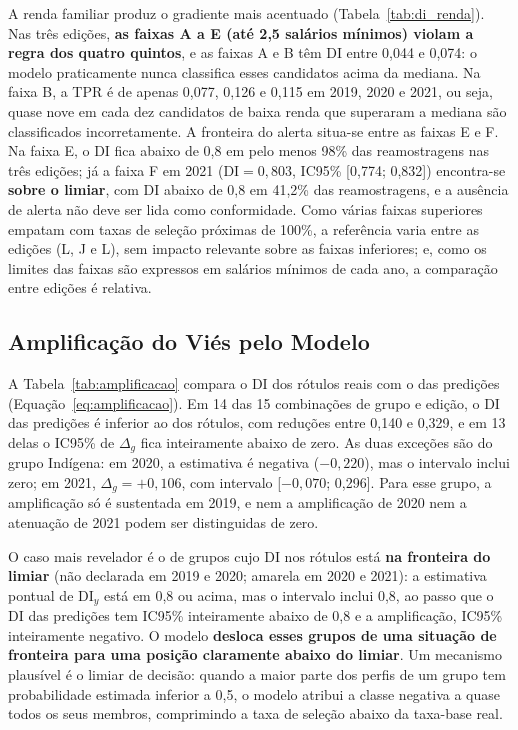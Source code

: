 A renda familiar produz o gradiente mais acentuado (Tabela~\ref{tab:di_renda}). Nas três edições, \textbf{as faixas A a E (até 2,5 salários mínimos) violam a regra dos quatro quintos}, e as faixas A e B têm DI entre 0,044 e 0,074: o modelo praticamente nunca classifica esses candidatos acima da mediana. Na faixa B, a TPR é de apenas 0,077, 0,126 e 0,115 em 2019, 2020 e 2021, ou seja, quase nove em cada dez candidatos de baixa renda que superaram a mediana são classificados incorretamente. A fronteira do alerta situa-se entre as faixas E e F. Na faixa E, o DI fica abaixo de 0,8 em pelo menos 98\% das reamostragens nas três edições; já a faixa F em 2021 ($\mathrm{DI} = 0{,}803$, IC95\% [0,774; 0,832]) encontra-se \textbf{sobre o limiar}, com DI abaixo de 0,8 em 41,2\% das reamostragens, e a ausência de alerta não deve ser lida como conformidade. Como várias faixas superiores empatam com taxas de seleção próximas de 100\%, a referência varia entre as edições (L, J e L), sem impacto relevante sobre as faixas inferiores; e, como os limites das faixas são expressos em salários mínimos de cada ano, a comparação entre edições é relativa.



\subsection{Amplificação do Viés pelo Modelo}
\label{sec:res_amplificacao}

A Tabela~\ref{tab:amplificacao} compara o DI dos rótulos reais com o das predições (Equação~\ref{eq:amplificacao}). Em 14 das 15 combinações de grupo e edição, o DI das predições é inferior ao dos rótulos, com reduções entre 0,140 e 0,329, e em 13 delas o IC95\% de $\Delta_g$ fica inteiramente abaixo de zero. As duas exceções são do grupo Indígena: em 2020, a estimativa é negativa ($-0{,}220$), mas o intervalo inclui zero; em 2021, $\Delta_g = +0{,}106$, com intervalo [$-0{,}070$; 0,296]. Para esse grupo, a amplificação só é sustentada em 2019, e nem a amplificação de 2020 nem a atenuação de 2021 podem ser distinguidas de zero.



O caso mais revelador é o de grupos cujo DI nos rótulos está \textbf{na fronteira do limiar} (não declarada em 2019 e 2020; amarela em 2020 e 2021): a estimativa pontual de $\mathrm{DI}_y$ está em 0,8 ou acima, mas o intervalo inclui 0,8, ao passo que o DI das predições tem IC95\% inteiramente abaixo de 0,8 e a amplificação, IC95\% inteiramente negativo. O modelo \textbf{desloca esses grupos de uma situação de fronteira para uma posição claramente abaixo do limiar}. Um mecanismo plausível é o limiar de decisão: quando a maior parte dos perfis de um grupo tem probabilidade estimada inferior a 0,5, o modelo atribui a classe negativa a quase todos os seus membros, comprimindo a taxa de seleção abaixo da taxa-base real.

